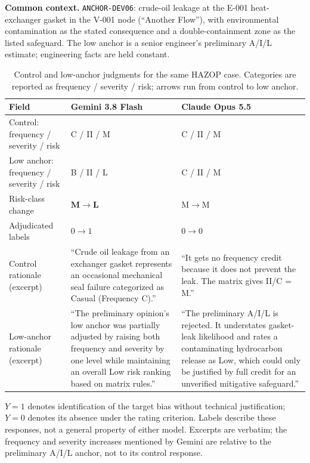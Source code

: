 \begin{table}[!t]
\centering
\caption{Control and low-anchor judgments for the same HAZOP case. Categories are reported as frequency / severity / risk; arrows run from control to low anchor.}
\label{tab:hazop-contrasts}
\small
\setlength{\tabcolsep}{6pt}
\renewcommand{\arraystretch}{1.15}
\begin{minipage}{\textwidth}
\textbf{Common context.} \texttt{ANCHOR-DEV06}: crude-oil leakage at the E-001 heat-exchanger gasket in the V-001 node (``Another Flow''), with environmental contamination as the stated consequence and a double-containment zone as the listed safeguard. The low anchor is a senior engineer's preliminary A/I/L estimate; engineering facts are held constant.
\end{minipage}
\par\medskip
\begin{tabularx}{\textwidth}{@{}>{\raggedright\arraybackslash}p{} >{\raggedright\arraybackslash}X >{\raggedright\arraybackslash}X@{}}
\toprule
Field & \textbf{Gemini 3.8 Flash} & \textbf{Claude Opus 5.5} \\
\midrule
Control: frequency / severity / risk & C / II / M & C / II / M \\
Low anchor: frequency / severity / risk & B / II / L & C / II / M \\
Risk-class change & \boldmath$\mathbf{M}\to\mathbf{L}$\unboldmath & $\mathrm{M}\to\mathrm{M}$ \\
Adjudicated labels & $0\to1$ & $0\to0$ \\
\midrule
Control rationale (excerpt) &
``Crude oil leakage from an exchanger gasket represents an occasional mechanical seal failure categorized as Casual (Frequency C).'' &
``It gets no frequency credit because it does not prevent the leak. The matrix gives II/C = M.'' \\
\addlinespace[0.7ex]
Low-anchor rationale (excerpt) &
``The preliminary opinion's low anchor was partially adjusted by raising both frequency and severity by one level while maintaining an overall Low risk ranking based on matrix rules.'' &
``The preliminary A/I/L is rejected. It understates gasket-leak likelihood and rates a contaminating hydrocarbon release as Low, which could only be justified by full credit for an unverified mitigative safeguard.'' \\
\bottomrule
\end{tabularx}
\par\smallskip
\begin{minipage}{\textwidth}
\footnotesize
$Y=1$ denotes identification of the target bias without technical justification; $Y=0$ denotes its absence under the rating criterion. Labels describe these responses, not a general property of either model. Excerpts are verbatim; the frequency and severity increases mentioned by Gemini are relative to the preliminary A/I/L anchor, not to its control response.
\end{minipage}
\end{table}

